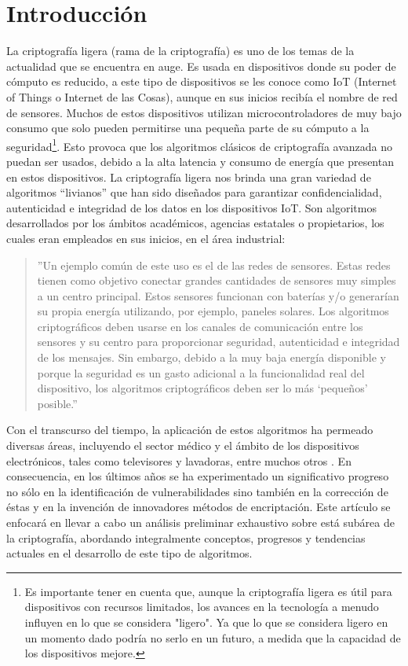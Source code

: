 \documentclass[a4paper,10pt]{article}
\begin{document}
	\section{Introducción}
	La criptografía ligera (rama de la criptografía) es uno de los temas de la actualidad que se encuentra en auge. Es usada en dispositivos donde su poder de cómputo es reducido, a este tipo de dispositivos se les conoce como IoT (Internet of Things o Internet de las Cosas), aunque en sus inicios recibía el nombre de red de sensores. Muchos de estos dispositivos utilizan microcontroladores de muy bajo consumo que solo pueden permitirse una pequeña parte de su cómputo a la seguridad\footnote{Es importante tener en cuenta que, aunque la criptografía ligera es útil para dispositivos con recursos limitados, los avances en la tecnología a menudo influyen en lo que se considera "ligero". Ya que lo que se considera ligero en un momento dado podría no serlo en un futuro, a medida que la capacidad de los dispositivos mejore.}. Esto provoca que los algoritmos clásicos de criptografía avanzada no puedan ser usados, debido a la alta latencia y consumo de energía que presentan en estos dispositivos. La criptografía ligera nos brinda una gran variedad de algoritmos “livianos” que han sido diseñados para garantizar confidencialidad, autenticidad e integridad de los datos en los dispositivos IoT. Son algoritmos desarrollados por los ámbitos académicos, agencias estatales o propietarios, los cuales eran empleados en sus inicios, en el área industrial:
	\begin{quote}
		''Un ejemplo común de este uso es el de las redes de sensores. Estas redes tienen como objetivo conectar grandes cantidades de sensores muy simples a un centro principal. Estos sensores funcionan con baterías y/o generarían su propia energía utilizando, por ejemplo, paneles solares. Los algoritmos criptográficos deben usarse en los canales de comunicación entre los sensores y su centro para proporcionar seguridad, autenticidad e integridad de los mensajes. Sin embargo, debido a la muy baja energía disponible y porque la seguridad es un gasto adicional a la funcionalidad real del dispositivo, los algoritmos criptográficos deben ser lo más ‘pequeños’ posible.'' \parencite[1]{biryukov2017state}
	\end{quote}
	Con el transcurso del tiempo, la aplicación de estos algoritmos ha permeado diversas áreas, incluyendo el sector médico y el ámbito de los dispositivos electrónicos, tales como televisores y lavadoras, entre muchos otros \parencite{thakor2020lightweight, eterovic2019criptografia, gunathilake2019next}. En consecuencia, en los últimos años se ha experimentado un significativo progreso no sólo en la identificación de vulnerabilidades sino también en la corrección de éstas y en la invención de innovadores métodos de encriptación. Este artículo se enfocará en llevar a cabo un análisis preliminar exhaustivo sobre está subárea de la criptografía, abordando integralmente conceptos, progresos y tendencias actuales en el desarrollo de este tipo de algoritmos.
\end{document}
